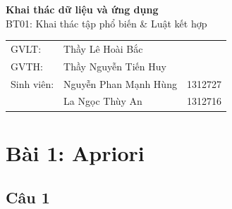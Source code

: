 \documentclass{article}
\begin{document}
	
\thispagestyle{empty}
\begin{titlepage}
\begin{center}
	\textbf{\huge{Khai thác dữ liệu và ứng dụng}}\\
	\Large{BT01: Khai thác tập phổ biến \& Luật kết hợp}	
\end{center}	

\vfill
\begin{flushright}
	\begin{tabular}{l l l}
		GVLT: & \quad Thầy Lê Hoài Bắc\\
		GVTH: & \quad Thầy Nguyễn Tiến Huy\\
		Sinh viên: & \quad Nguyễn Phan Mạnh Hùng & 1312727\\
		& \quad La Ngọc Thùy An & 1312716\\
	\end{tabular}
\end{flushright}
\end{titlepage}
\pagebreak
\thispagestyle{empty}
\tableofcontents
\pagebreak 
\section{Bài 1: Apriori}\label{sec: prob1}
\subsection{Câu 1}
\end{document}
